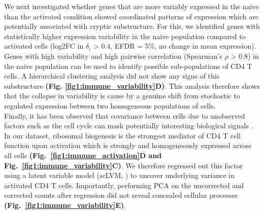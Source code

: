 We next investigated whether genes that are more variably expressed in the naive than the activated condition showed coordinated patterns of expression which are potentially associated with cryptic substructure. For this, we identified genes with statistically higher expression variability in the naive population compared to activated cells (log2FC in $\delta_i$ > 0.4, EFDR = 5\%, no change in mean expression). Genes with high variability and high pairwise correlation (Spearman’s $\rho$ > 0.8) in the naive population can be used to identify possible sub-populations of CD4\plus{} T cells. A hierarchical clustering analysis did not show any signs of this substructure \textbf{(Fig. \ref{fig1:immune_variability}D)}. This analysis therefore shows that the collapse in variability is cause by a genuine shift from stochastic to regulated expression between two homogeneous populations of cells.\\

Finally, it has been observed that covariance between cells due to unobserved factors such as the cell cycle can mask potentially interesting biological signals \citep{Stegle2015, Buettner2015}. In our dataset, ribosomal biogenesis is the strongest mediator of CD4\plus{} T cell function upon activation which is strongly and homogeneously expressed across all cells \textbf{(Fig.~\ref{fig1:immune_activation}D and Fig.~\ref{fig1:immune_variability}C)}. We therefore regressed out this factor using a latent variable model (scLVM, \citep{Buettner2015}) to uncover underlying variance in activated CD4\plus{} T cells. Importantly, performing PCA on the uncorrected and corrected counts after regression did not reveal concealed cellular processes \textbf{(Fig.~\ref{fig1:immune_variability}E)}.\\

\newpage


